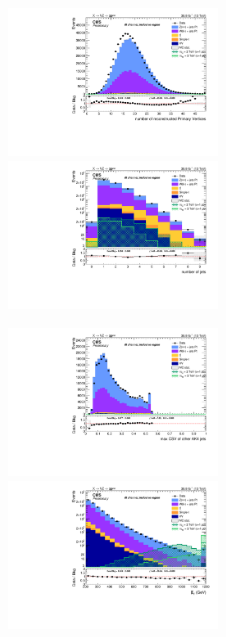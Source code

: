 \begin{figure}[!htb]
  \begin{center}  
    \includegraphics[width=0.495\textwidth]{plots/v9_U/XVZnnInc/nPV.pdf}
    \includegraphics[width=0.495\textwidth]{plots/v9_U/XVZnnInc/nJets.pdf}

    \includegraphics[width=0.495\textwidth]{plots/v9_U/XVZnnInc/MaxJetBTag.pdf}
    \includegraphics[width=0.495\textwidth]{plots/v9_U/XVZnnInc/MEt_pt.pdf}


\end{center}
\end{figure}
